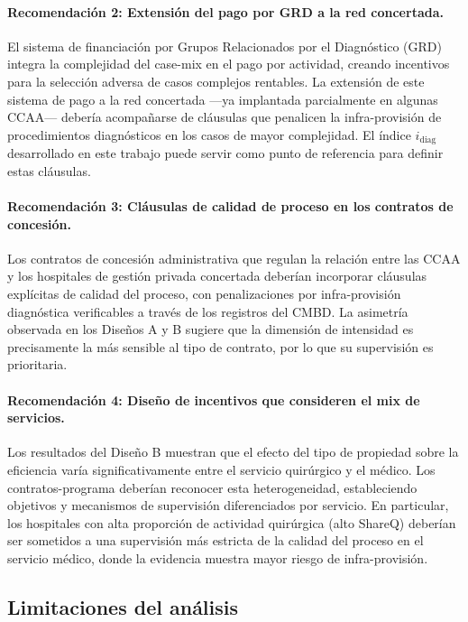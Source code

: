 \paragraph{Recomendación 2: Extensión del pago por GRD a la red concertada.}
El sistema de financiación por Grupos Relacionados por el Diagnóstico (GRD) integra la complejidad del case-mix en el pago por actividad, creando incentivos para la selección adversa de casos complejos rentables. La extensión de este sistema de pago a la red concertada —ya implantada parcialmente en algunas CCAA— debería acompañarse de cláusulas que penalicen la infra-provisión de procedimientos diagnósticos en los casos de mayor complejidad. El índice $i_{\text{diag}}$ desarrollado en este trabajo puede servir como punto de referencia para definir estas cláusulas.

\paragraph{Recomendación 3: Cláusulas de calidad de proceso en los contratos de concesión.}
Los contratos de concesión administrativa que regulan la relación entre las CCAA y los hospitales de gestión privada concertada deberían incorporar cláusulas explícitas de calidad del proceso, con penalizaciones por infra-provisión diagnóstica verificables a través de los registros del CMBD. La asimetría observada en los Diseños A y B sugiere que la dimensión de intensidad es precisamente la más sensible al tipo de contrato, por lo que su supervisión es prioritaria.

\paragraph{Recomendación 4: Diseño de incentivos que consideren el mix de servicios.}
Los resultados del Diseño B muestran que el efecto del tipo de propiedad sobre la eficiencia varía significativamente entre el servicio quirúrgico y el médico. Los contratos-programa deberían reconocer esta heterogeneidad, estableciendo objetivos y mecanismos de supervisión diferenciados por servicio. En particular, los hospitales con alta proporción de actividad quirúrgica (alto ShareQ) deberían ser sometidos a una supervisión más estricta de la calidad del proceso en el servicio médico, donde la evidencia muestra mayor riesgo de infra-provisión.

\subsection{Limitaciones del análisis}
\label{subsec:limitaciones}


